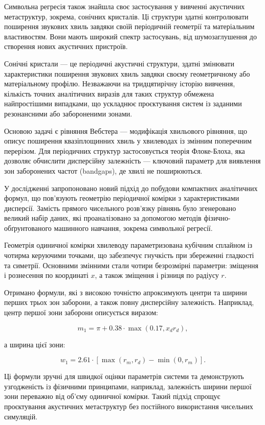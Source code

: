 \documentclass[14pt,a4paper,titlepage,oneside]{book}
\numberwithin{equation}{part}
\begin{document}
Символьна регресія також знайшла своє застосування у вивченні акустичних метаструктур, зокрема, сонічних кристалів. Ці структури здатні контролювати поширення звукових хвиль завдяки своїй періодичній геометрії та матеріальним властивостям. Вони мають широкий спектр застосувань, від шумозаглушення до створення нових акустичних пристроїв.

Сонічні кристали — це періодичні акустичні структури, здатні змінювати характеристики поширення звукових хвиль завдяки своєму геометричному або матеріальному профілю. Незважаючи на тридцятирічну історію вивчення, кількість точних аналітичних виразів для таких структур обмежена найпростішими випадками, що ускладнює проєктування систем із заданими резонансними або забороненими зонами.

Основою задачі є рівняння Вебстера — модифікація хвильового рівняння, що описує поширення квазіплощинних хвиль у хвилеводах із змінним поперечним перерізом. Для періодичних структур застосовується теорія Флоке-Блоха, яка дозволяє обчислити дисперсійну залежність — ключовий параметр для виявлення зон заборонених частот (bandgaps), де хвилі не поширюються.

У дослідженні \cite{sonic_crystal} запропоновано новий підхід до побудови компактних аналітичних формул, що пов'язують геометрію періодичної комірки з характеристиками дисперсії. Замість прямого чисельного розв'язку рівнянь було згенеровано великий набір даних, які проаналізовано за допомогою методів фізично-обґрунтованого машинного навчання, зокрема символьної регресії.

Геометрія одиничної комірки хвилеводу параметризована кубічним сплайном із чотирма керуючими точками, що забезпечує гнучкість при збереженні гладкості та симетрії. Основними змінними стали чотири безрозмірні параметри: зміщення і рознесення по координаті $x$, а також зміщення і різниця по радіусу $r$.

Отримано формули, які з високою точністю апроксимують центри та ширини перших трьох зон заборони, а також повну дисперсійну залежність. Наприклад, центр першої зони заборони описується виразом:

\[
m_1 = \pi + 0.38 \cdot \max(0.17, x_d r_d),
\]

а ширина цієї зони:

\[
w_1 = 2.61 \cdot \left[\max(r_m, r_d) - \min(0, r_m)\right].
\]

Ці формули зручні для швидкої оцінки параметрів системи та демонструють узгодженість із фізичними принципами, наприклад, залежність ширини першої зони переважно від об'єму одиничної комірки. Такий підхід спрощує проєктування акустичних метаструктур без постійного використання чисельних симуляцій.
\end{document}
